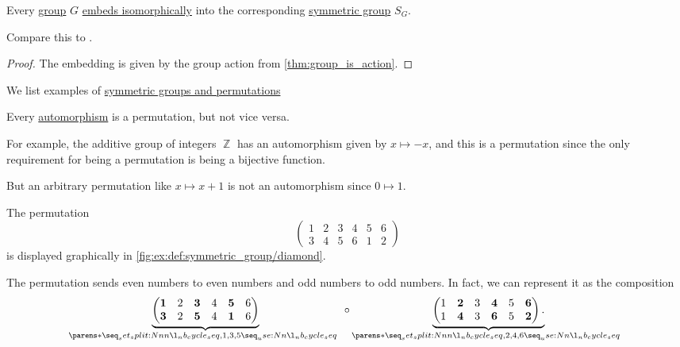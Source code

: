 \begin{theorem}\label{thm:cayleys_theorem}
  Every \hyperref[def:group]{group} \( G \) \hyperref[rem:embeds_isomorphically]{embeds isomorphically} into the corresponding \hyperref[def:symmetric_group]{symmetric group} \( S_G \).
\end{theorem}
\begin{comments}
  \item Compare this to .
\end{comments}
\begin{proof}
  The embedding is given by the group action from \cref{thm:group_is_action}.
\end{proof}

\begin{example}\label{ex:def:symmetric_group}
  We list examples of \hyperref[def:symmetric_group]{symmetric groups and permutations}
  \begin{thmenum}
     Every \hyperref[def:morphism_invertibility/automorphism]{automorphism} is a permutation, but not vice versa.

    For example, the additive group of integers \( \BbbZ \) has an automorphism given by \( x \mapsto -x \), and this is a permutation since the only requirement for being a permutation is being a bijective function.

    But an arbitrary permutation like \( x \mapsto x + 1 \) is not an automorphism since \( 0 \mapsto 1 \).

     The permutation
    \begin{equation}\label{eq:ex:def:symmetric_group/diamond}
      \begin{pmatrix}
        1 & 2 & 3 & 4 & 5 & 6 \\
        3 & 4 & 5 & 6 & 1 & 2
      \end{pmatrix}
    \end{equation}
    is displayed graphically in \ref{fig:ex:def:symmetric_group/diamond}.

    The permutation sends even numbers to even numbers and odd numbers to odd numbers. In fact, we can represent it as the composition
    \begin{equation*}
      \underbrace
        {
          \begin{pmatrix}
            \mathbf{1} & 2 & \mathbf{3} & 4 & \mathbf{5} & 6 \\
            \mathbf{3} & 2 & \mathbf{5} & 4 & \mathbf{1} & 6
          \end{pmatrix}
        }
        _
        {
          \cycle{ 1, 3, 5 }
        }
      \bincirc
      \underbrace
        {
          \begin{pmatrix}
            1 & \mathbf{2} & 3 & \mathbf{4} & 5 & \mathbf{6} \\
            1 & \mathbf{4} & 3 & \mathbf{6} & 5 & \mathbf{2}
          \end{pmatrix}.
        }
        _
        {
          \cycle{ 2, 4, 6 }
        }
    \end{equation*}


\end{thmenum}
\end{example}
